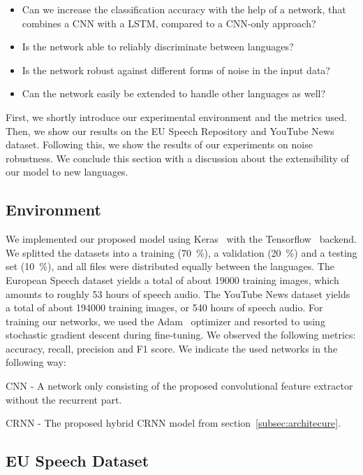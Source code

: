 \documentclass{llncs}
\begin{document}
\begin{itemize}
	\item Can we increase the classification accuracy with the help of a network, that combines a \ac{CNN} with a \ac{LSTM}, compared to a \ac{CNN}-only approach?
	\item Is the network able to reliably discriminate between languages?
	\item Is the network robust against different forms of noise in the input data?
	\item Can the network easily be extended to handle other languages as well?
\end{itemize}
First, we shortly introduce our experimental environment and the metrics used.
Then, we show our results on the EU Speech Repository and YouTube News dataset.
Following this, we show the results of our experiments on noise robustness.
We conclude this section with a discussion about the extensibility of our model to new languages.

\subsection{Environment}

We implemented our proposed model using Keras~\cite{Chollet2017Keras} with the Tensorflow~\cite{Abadi2016Tensorflow} backend.
We splitted the datasets into a training (\SI{70}{\percent}), a validation (\SI{20}{\percent}) and a testing set (\SI{10}{\percent}), and all files were distributed equally between the languages.
The European Speech dataset yields a total of about \num{19000} training images, which amounts to roughly 53 hours of speech audio.
The YouTube News dataset yields a total of about \num{194000} training images, or 540 hours of speech audio.
For training our networks, we used the Adam~\cite{Kingma2015Adam} optimizer and resorted to using stochastic gradient descent during fine-tuning.
We observed the following metrics: accuracy, recall, precision and F1 score.
We indicate the used networks in the following way:
\begin{enumerate*}[label={(\arabic*)}]
	\item \ac{CNN} - A network only consisting of the proposed convolutional feature extractor without the recurrent part.
	\item \ac{CRNN} - The proposed hybrid \ac{CRNN} model from section~\ref{subsec:architecure}.
\end{enumerate*}

\subsection{EU Speech Dataset}
\end{document}
